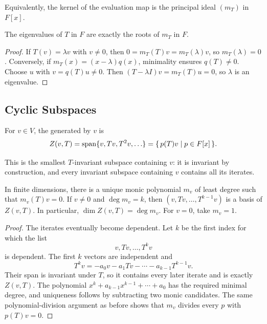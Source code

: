Equivalently, the kernel of the evaluation map is the principal ideal $(m_T)$ in $F[x]$.

\begin{Theorem}
The eigenvalues of $T$ in $F$ are exactly the roots of $m_T$ in $F$.
\end{Theorem}
\begin{proof}
If $T(v)=\lambda v$ with $v\ne0$, then $0=m_T(T)v=m_T(\lambda)v$, so $m_T(\lambda)=0$. Conversely, if $m_T(x)=(x-\lambda)q(x)$, minimality ensures $q(T)\ne0$. Choose $u$ with $v=q(T)u\ne0$. Then $(T-\lambda I)v=m_T(T)u=0$, so $\lambda$ is an eigenvalue.
\end{proof}

\subsection{Cyclic Subspaces}

\begin{Definition}
For $v\in V$, the  generated by $v$ is
\begin{equation*}
Z(v,T)=\operatorname{span}\{v,Tv,T^2v,\ldots\}=\qty{\, p(T)v \mid p\in F[x] \,}.
\end{equation*}
\end{Definition}

This is the smallest $T$-invariant subspace containing $v$: it is invariant by construction, and every invariant subspace containing $v$ contains all its iterates.

\begin{Theorem}\label{thm:CyclicBasis}
In finite dimensions, there is a unique monic polynomial $m_v$ of least degree such that $m_v(T)v=0$. If $v\ne0$ and $\deg m_v=k$, then $(v,Tv,\ldots,T^{k-1}v)$ is a basis of $Z(v,T)$. In particular, $\dim Z(v,T)=\deg m_v$. For $v=0$, take $m_v=1$.
\end{Theorem}
\begin{proof}
The iterates eventually become dependent. Let $k$ be the first index for which the list
\begin{equation*}
v,Tv,\ldots,T^kv
\end{equation*}
is dependent. The first $k$ vectors are independent and
\begin{equation*}
T^kv=-a_0v-a_1Tv-\cdots-a_{k-1}T^{k-1}v.
\end{equation*}
Their span is invariant under $T$, so it contains every later iterate and is exactly $Z(v,T)$. The polynomial $x^k+a_{k-1}x^{k-1}+\cdots+a_0$ has the required minimal degree, and uniqueness follows by subtracting two monic candidates. The same polynomial-division argument as before shows that $m_v$ divides every $p$ with $p(T)v=0$.
\end{proof}

